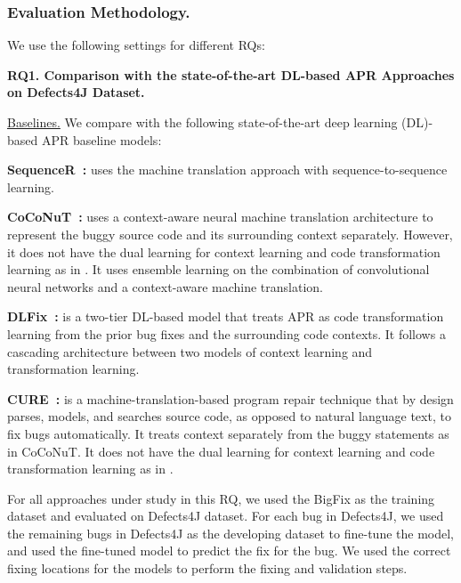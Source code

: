 \subsubsection{Evaluation Methodology.}
We use the following settings for different RQs:

{\bf RQ1. Comparison with the state-of-the-art DL-based APR Approaches on
  Defects4J Dataset.}

\underline{Baselines.} We compare {\tool} with the following
state-of-the-art deep learning (DL)-based APR baseline models:



{\bf SequenceR~\cite{chen2018sequencer}: } uses the machine
translation approach with sequence-to-sequence learning.

{\bf CoCoNuT~\cite{lutellier2020coconut}:} uses a context-aware neural
machine translation architecture to represent the buggy source code
and its surrounding context separately. However, it does not have the
dual learning for context learning and code transformation learning as
in {\tool}. It uses ensemble learning on the combination of
convolutional neural networks and a context-aware machine translation.

{\bf DLFix~\cite{li2020dlfix}: } is a two-tier DL-based model that
treats APR as code transformation learning from the prior bug fixes
and the surrounding code contexts. It follows a cascading architecture
between two models of context learning and transformation learning.

{\bf CURE~\cite{cure-icse21}: } is a machine-translation-based program repair
technique that by design parses, models, and searches source code, as
opposed to natural language text, to fix bugs automatically. It treats
context separately from the buggy statements as in CoCoNuT. It does
not have the dual learning for context learning and code
transformation learning as in {\tool}.



For all approaches under study in this RQ, we used the BigFix as the
training dataset and evaluated on Defects4J dataset. For each bug in
Defects4J, we used the remaining bugs in Defects4J as the developing
dataset to fine-tune the model, and used the fine-tuned model to
predict the fix for the bug. We used the correct fixing locations for
the models to perform the fixing and validation steps.


